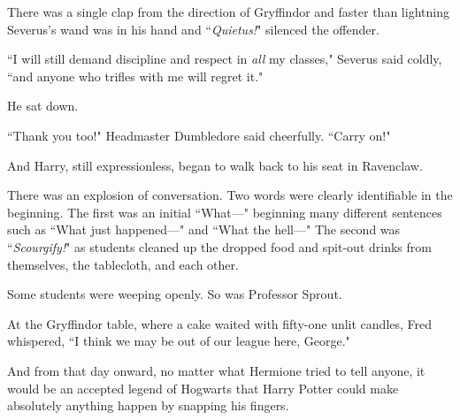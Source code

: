 There was a single clap from the direction of Gryffindor and faster than lightning Severus's wand was in his hand and ``\emph{Quietus!}" silenced the offender.

``I will still demand discipline and respect in \emph{all} my classes," Severus said coldly, ``and anyone who trifles with me will regret it."

He sat down.

``Thank you too!" Headmaster Dumbledore said cheerfully. ``Carry on!"

And Harry, still expressionless, began to walk back to his seat in Ravenclaw.

There was an explosion of conversation. Two words were clearly identifiable in the beginning. The first was an initial ``What—" beginning many different sentences such as ``What just happened—" and ``What the hell—" The second was ``\emph{Scourgify!}" as students cleaned up the dropped food and spit-out drinks from themselves, the tablecloth, and each other.

Some students were weeping openly. So was Professor Sprout.

At the Gryffindor table, where a cake waited with fifty-one unlit candles, Fred whispered, ``I think we may be out of our league here, George."

And from that day onward, no matter what Hermione tried to tell anyone, it would be an accepted legend of Hogwarts that Harry Potter could make absolutely anything happen by snapping his fingers.

